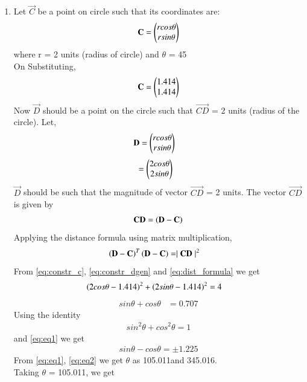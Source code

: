 \begin{enumerate}[label=\thesection.\arabic*.,ref=\thesection.\theenumi]
\item 
Let $\vec{C}$ be a point on circle such that its coordinates are:
\begin{align}
\mathbf{C}= \begin{pmatrix}rcos\theta\\rsin\theta\end{pmatrix}
\label{eq:constr_cgen}
\end{align}
where r = 2 units (radius of circle) and $\theta$ = 45\degree \\
On Substituting,
\begin{align}
\mathbf{C}= \begin{pmatrix}1.414\\1.414\end{pmatrix}
\label{eq:constr_c}
\end{align}
Now $\vec{D}$ should be a point on the circle such that $\vec{CD}$ = 2 units (radius of the circle).
Let,
\begin{align}
\mathbf{D} & = \begin{pmatrix}rcos\theta\\rsin\theta\end{pmatrix} 
\end{align}
\begin{align}
  & = \begin{pmatrix}2cos\theta\\2sin\theta\end{pmatrix}
\label{eq:constr_dgen}
\end{align}
$\vec{D}$ should be such that the magnitude of vector $\vec{CD}$ = 2 units. The vector $\vec{CD}$ is given by 
\begin{align}
\mathbf{CD} = \left(\mathbf{D} - \mathbf{C}\right)
\end{align}
Applying the distance formula using matrix multiplication,
\begin{align}
\left(\mathbf{D} - \mathbf{C}\right)^T\left(\mathbf{D} - \mathbf{C}\right) &=  \mid\mathbf{CD}\mid ^2
 \label{eq:dist_formula}
\end{align}
 From  \eqref{eq:constr_c}, \eqref{eq:constr_dgen} and \eqref{eq:dist_formula} we get 
\begin{align}
 \left(2cos \theta - 1.414\right)^2 +  \left(2sin \theta - 1.414\right)^2 &= 4 
\end{align}
\begin{align}
 sin \theta + cos \theta &= 0.707
  \label{eq:eq1}
\end{align}
Using the identity
 \begin{align}
   sin^2 \theta + cos^2 \theta = 1
 \end{align}
 and  \eqref{eq:eq1} we get
  \begin{align}
  sin\theta - cos\theta =  \pm 1.225
  \label{eq:eq2}
  \end{align}
 From \eqref{eq:eq1}, \eqref{eq:eq2} we get $\theta$ as 105.011\degree and 345.016\degree.\\
 Taking $\theta$ = 105.011\degree, we get 

\end{enumerate}
